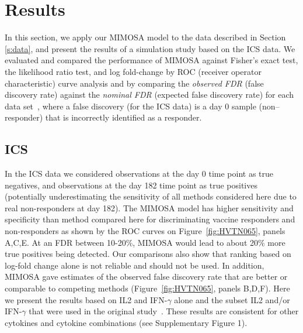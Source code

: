 \documentclass[12pt,oupdraft]{biostatistics}
\begin{document}
\section{Results}
\label{s:results}
In this section, we apply our MIMOSA model to the data described in Section \ref{s:data}, and present the results of a simulation study based on the ICS data. We evaluated and compared the performance of MIMOSA against Fisher's exact test, the likelihood ratio test, and log fold-change by ROC (receiver operator characteristic) curve analysis and by comparing the \textit{observed FDR} (false discovery rate) against the \textit{nominal FDR} (expected false discovery rate) for each data set~\citep{Storey:2002vj}, where a false discovery (for the ICS data) is a day 0 sample (non--responder) that is incorrectly identified as a responder.

\subsection{ICS}
In the ICS data we considered observations at the day 0 time point as true negatives, and observations at the day 182 time point as true positives (potentially underestimating the sensitivity of all methods considered here due to real non-responders at day 182). The MIMOSA model has higher sensitivity and specificity than method compared here for discriminating vaccine responders and non-responders  as shown by the ROC curves on Figure~\ref{fig:HVTN065}, panels A,C,E.
At an FDR between 10-20\%, MIMOSA would lead to about 20\% more true positives being detected. Our comparisons also show that ranking based on log-fold change alone is not reliable and should not be used.
In addition, MIMOSA gave estimates of the observed false discovery rate that are better or comparable to competing methods (Figure~\ref{fig:HVTN065}, panels B,D,F). Here we present the results based on IL2 and IFN-$\gamma$ alone and the subset IL2 and/or IFN-$\gamma$ that were used in the original study~\citep{Goepfert:2011ci}. These results are consistent for other cytokines and cytokine combinations (see Supplementary Figure 1).
\end{document}
